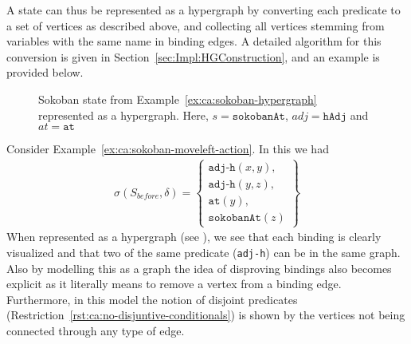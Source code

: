 \documentclass[../Master.tex]{subfiles}
\begin{document}
    A state can thus be represented as a hypergraph by converting each predicate to a set of vertices as described above, and collecting all vertices stemming from variables with the same name in binding edges. A detailed algorithm for this conversion is given in Section~\ref{sec:Impl:HGConstruction}, and an example is provided below.

%
%

\begin{figure}
    \centering
        
        \caption{Sokoban state from Example~\ref{ex:ca:sokoban-hypergraph} represented as a hypergraph. Here, $s = \texttt{sokobanAt}$, $adj = \texttt{hAdj}$ and $at = \texttt{at}$}\label{fig:ca:sokoban-hypergraph}
\end{figure}

\begin{example}\label{ex:ca:sokoban-hypergraph}
	Consider Example~\ref{ex:ca:sokoban-moveleft-action}. In this we had
	\begin{align*}
		\sigma(S_{before}, \delta) =
			\left\{
			\begin{gathered}
				\texttt{adj-h}(x, y), \\
				\texttt{adj-h}(y, z), \\
				\texttt{at}(y), \\
				\texttt{sokobanAt}(z)
			\end{gathered}
			\right\}
	\end{align*}
	When represented as a hypergraph (see ),
	we see that each binding is clearly visualized and that two of the same predicate (\texttt{adj-h}) can be in the same graph.
	Also by modelling this as a graph the idea of disproving bindings also
	becomes explicit as it literally means to remove a vertex from a binding edge.
	Furthermore, in this model the notion of disjoint predicates (Restriction~\ref{rst:ca:no-disjuntive-conditionals}) is shown by the vertices not being connected through any type of edge.
\end{example}
\end{document}
